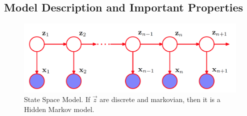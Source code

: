 \documentclass[12pt,twoside]{article}
\begin{document}
\subsection{Model Description and Important Properties}
\begin{figure}[H]
	\begin{center}
		\includegraphics[width = 0.7\hsize]{./figures/HiddenMarkovModel.png} %
		\caption{State Space Model. If $\vec{z}$ are discrete and markovian, then it is a Hidden Markov model.} %
		\label{fig:Hidden Markov Model} %
	\end{center}
\end{figure}
\end{document}
